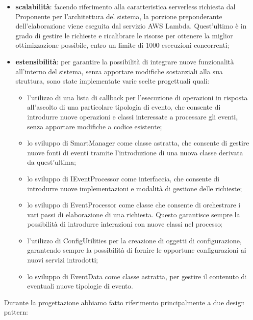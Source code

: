 \begin{itemize}
	\item \textbf{scalabilità}: facendo riferimento alla caratteristica serverless richiesta dal Proponente per l'architettura del sistema, la porzione preponderante dell'elaborazione viene eseguita dal servizio AWS Lambda. Quest'ultimo è in grado di gestire le richieste e ricalibrare le risorse per ottenere la miglior ottimizzazione possibile, entro un limite di 1000 esecuzioni concorrenti;
	\item \textbf{estensibilità}: per garantire la possibilità di integrare nuove funzionalità all'interno del sistema, senza apportare modifiche sostanziali alla sua struttura, sono state implementate varie scelte progettuali quali:
	\begin{itemize}
		\item l'utilizzo di una lista di callback per l'esecuzione di operazioni in risposta all'ascolto di una particolare tipologia di evento, che consente di introdurre nuove operazioni e classi interessate a processare gli eventi, senza apportare modifiche a codice esistente;
		\item lo sviluppo di SmartManager come classe astratta, che consente di gestire nuove fonti di eventi tramite l'introduzione di una nuova classe derivata da quest'ultima;
		\item lo sviluppo di IEventProcessor come interfaccia, che consente di introdurre nuove implementazioni e modalità di gestione delle richieste;
		\item lo sviluppo di EventProcessor come classe che consente di orchestrare i vari passi di elaborazione di una richiesta. Questo garantisce sempre la possibilità di introdurre interazioni con nuove classi nel processo;
		\item l'utilizzo di ConfigUtilities per la creazione di oggetti di configurazione, garantendo sempre la possibilità di fornire le opportune configurazioni ai nuovi servizi introdotti;
		\item lo sviluppo di EventData come classe astratta, per gestire il contenuto di eventuali nuove tipologie di evento.
	\end{itemize}
\end{itemize}
Durante la progettazione abbiamo fatto riferimento principalmente a due design pattern:
